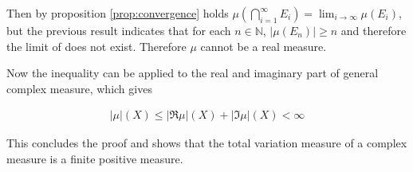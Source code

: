 \documentclass[12pt]{artikel1}
\begin{document}
Then by proposition \ref{prop:convergence} holds $\mu\left(\bigcap_{i=1}^\infty E_i\right)=\lim_{i\rightarrow\infty}\mu(E_i)$, but the previous result indicates that for each $n\in\mathbb{N}$, $|\mu(E_n)|\geq n$ and therefore the limit of does not exist. Therefore $\mu$ cannot be a real measure.

Now the inequality can be applied to the real and imaginary part of general complex measure, which gives

\begin{gather*}
    |\mu|(X)\leq|\Re\mu|(X)+|\Im\mu|(X)<\infty
\end{gather*}

This concludes the proof and shows that the total variation measure of a complex measure is a finite positive measure.

\rightline{$\blacksquare$}

\clearpage

\printbibliography
\end{document}
